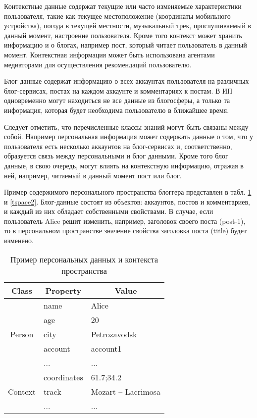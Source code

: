 Контекстные данные содержат текущие или часто изменяемые характеристики пользователя, такие как текущее местоположение (координаты мобильного устройства), погода в текущей местности, музыкальный трек, прослушиваемый в данный момент, настроение пользователя. Кроме того контекст может хранить информацию и о блогах, например пост, который читает пользователь в данный момент. Контекстная информация может быть использована агентами медиаторами для осуществления рекомендаций пользователю.

Блог данные содержат информацию о всех аккаунтах пользователя на различных блог-сервисах, постах на каждом аккаунте и комментариях к постам. В ИП одновременно могут находиться не все
данные из блогосферы, а только та информация, которая будет необходима пользователю в ближайшее время.

Следует отметить, что перечисленные классы знаний могут быть связаны между собой. Например персональная информация может содержать данные о том, что у пользователя есть несколько аккаунтов на блог-сервисах и, соответственно, образуется связь между персональными и блог данными. Кроме того блог данные, в свою очередь, могут влиять на контекстную информацию, отражая в ней, например, читаемый в данный момент пост или блог.

Пример содержимого персонального пространства блоггера представлен в табл. \ref{tspace1} и \ref{tspace2}. Блог-данные состоят из объектов: аккаунтов, постов и комментариев, и каждый из них обладает собственными свойствами. В случае, если пользователь Alice решит изменить, например, заголовок своего поста (post-1), то в персональном пространстве значение свойства заголовка поста (title) будет изменено.

\begin{table}[h]
\caption{Пример персональных данных и контекста пространства}
\begin{center}
\begin{tabular}{|c|l|l|}
\hline
{\bf Class} & \multicolumn{1}{|c|}{\bf Property} & \multicolumn{1}{|c|}{\bf Value} \\
\hline
\multirow{5}{*}{Person} & name & Alice \\
\cline{2-3}
& age & 20 \\
\cline{2-3}
& city & Petrozavodsk \\
\cline{2-3}
& account & account1 \\
\cline{2-3}
& ... & ... \\
\hline
\multirow{3}{*}{Context} & coordinates & 61.7;34.2 \\
\cline{2-3}
& track & Mozart -- Lacrimosa \\
\cline{2-3}
& ... & ... \\
\hline
\end{tabular}

\label{tspace1}
\end{center}
\end{table}


